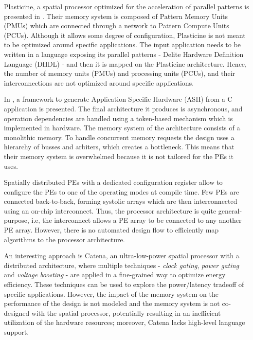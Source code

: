 Plasticine, a spatial processor optimized for the acceleration of parallel patterns is presented in \cite{prabhakar2017plasticine}. Their memory system is composed of Pattern Memory Units (PMUs) which are connected through a network to Pattern Compute Units (PCUs). Although it allows some degree of configuration, Plasticine is not meant to be optimized around specific applications. The input application needs to be written in a language exposing its parallel patterns - Delite Hardware Definition Language (DHDL) - and then it is mapped on the Plasticine architecture. Hence, the number of memory units (PMUs) and processing units (PCUs), and their interconnections are not optimized around specific applications.

In \cite{budiu2004spatial}, a framework to generate Application Specific Hardware (ASH) from a C application is presented. The final architecture it produces is asynchronous, and operation dependencies are handled using a token-based mechanism which is implemented in hardware. The memory system of the architecture consists of a monolithic memory. To handle concurrent memory requests the design uses a hierarchy of busses and arbiters, which creates a bottleneck. This means that their memory system is overwhelmed because it is not tailored for the PEs it uses.

Spatially distributed PEs with a dedicated configuration register allow to configure the PEs to one of the operating modes \cite{streamproc2019} at compile time. Few PEs are connected back-to-back, forming systolic arrays which are then interconnected using an on-chip interconnect. Thus, the processor architecture is quite general-purpose, i.e, the interconnect allows a PE array to be connected to any another PE array. However, there is no automated design flow to efficiently map algorithms to the processor architecture.

An interesting approach is Catena\cite{cerqueira2020catena}, an ultra-low-power spatial processor with a distributed architecture, where multiple techniques - \textit{clock gating}, \textit{power gating} and \textit{voltage boosting} - are applied in a fine-grained way to optimize energy efficiency. These techniques can be used to explore the power/latency tradeoff of specific applications. However, the impact of the memory system on the performance of the design is not modeled and the memory system is not co-designed with the spatial processor, potentially resulting in an inefficient utilization of the hardware resources; moreover, Catena lacks high-level language support.

